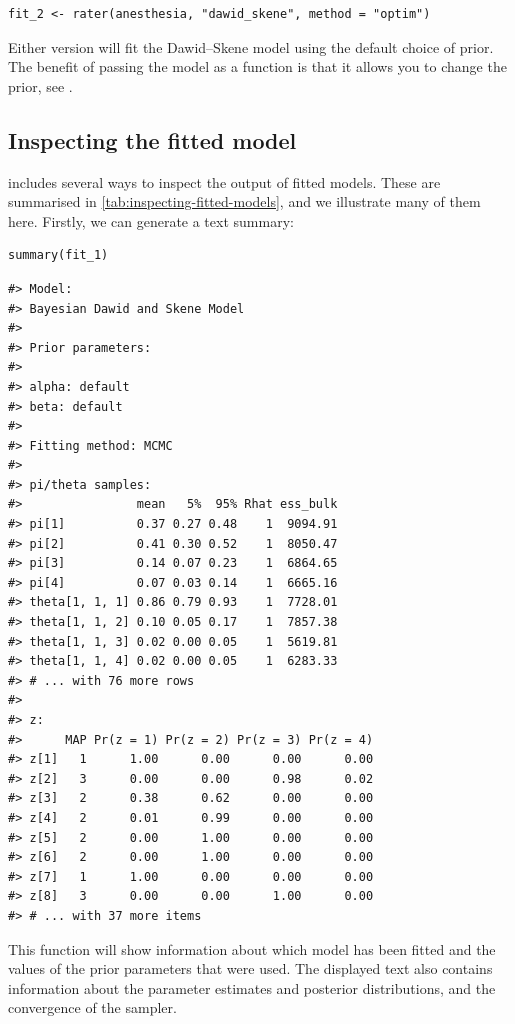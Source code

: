 \begin{verbatim}
fit_2 <- rater(anesthesia, "dawid_skene", method = "optim")
\end{verbatim}

Either version will fit the Dawid--Skene model using the default choice of
prior. The benefit of passing the model as a function is that it allows you to
change the prior, see .

\hypertarget{inspecting-the-fitted-model}{%
\subsection{Inspecting the fitted model}\label{inspecting-the-fitted-model}}

 includes several ways to inspect the output of fitted models.
These are summarised in \autoref{tab:inspecting-fitted-models}, and we
illustrate many of them here. Firstly, we can generate a text summary:

\begin{verbatim}
summary(fit_1)
\end{verbatim}

\begin{verbatim}
#> Model:
#> Bayesian Dawid and Skene Model 
#> 
#> Prior parameters:
#> 
#> alpha: default
#> beta: default
#> 
#> Fitting method: MCMC
#> 
#> pi/theta samples:
#>                mean   5%  95% Rhat ess_bulk
#> pi[1]          0.37 0.27 0.48    1  9094.91
#> pi[2]          0.41 0.30 0.52    1  8050.47
#> pi[3]          0.14 0.07 0.23    1  6864.65
#> pi[4]          0.07 0.03 0.14    1  6665.16
#> theta[1, 1, 1] 0.86 0.79 0.93    1  7728.01
#> theta[1, 1, 2] 0.10 0.05 0.17    1  7857.38
#> theta[1, 1, 3] 0.02 0.00 0.05    1  5619.81
#> theta[1, 1, 4] 0.02 0.00 0.05    1  6283.33
#> # ... with 76 more rows
#> 
#> z:
#>      MAP Pr(z = 1) Pr(z = 2) Pr(z = 3) Pr(z = 4)
#> z[1]   1      1.00      0.00      0.00      0.00
#> z[2]   3      0.00      0.00      0.98      0.02
#> z[3]   2      0.38      0.62      0.00      0.00
#> z[4]   2      0.01      0.99      0.00      0.00
#> z[5]   2      0.00      1.00      0.00      0.00
#> z[6]   2      0.00      1.00      0.00      0.00
#> z[7]   1      1.00      0.00      0.00      0.00
#> z[8]   3      0.00      0.00      1.00      0.00
#> # ... with 37 more items
\end{verbatim}

This function will show information about which model has been fitted and the
values of the prior parameters that were used. The displayed text also contains
information about the parameter estimates and posterior distributions, and the
convergence of the sampler.

